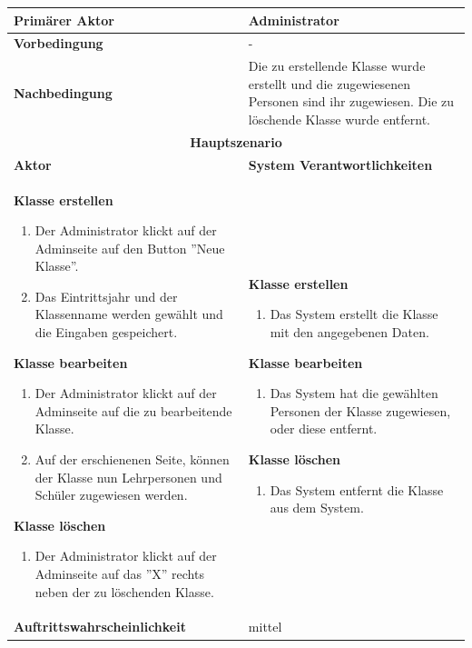 \begin{tabularx}{\textwidth}{| X | X |}
	\hline
		\textbf{Primärer Aktor} & Administrator \\
	\hline
		\textbf{Vorbedingung} & - \\
	\hline
		\textbf{Nachbedingung} & Die zu erstellende Klasse wurde erstellt und die zugewiesenen Personen sind ihr zugewiesen. Die zu löschende Klasse wurde entfernt. \\
	\hline
		\multicolumn{2}{|c|}{\textbf{Hauptszenario}} \\
	\hline
		\textbf{Aktor} & \textbf{System Verantwortlichkeiten} \\
	\hline
		\textbf{Klasse erstellen}
		\begin{enumerate}
			\item Der Administrator klickt auf der Adminseite auf den Button ''Neue Klasse''.
			\item Das Eintrittsjahr und der Klassenname werden gewählt und die Eingaben gespeichert.
		\end{enumerate}
		
		\textbf{Klasse bearbeiten}
		\begin{enumerate}
			\item Der Administrator klickt auf der Adminseite auf die zu bearbeitende Klasse.
			\item Auf der erschienenen Seite, können der Klasse nun Lehrpersonen und Schüler zugewiesen werden.
		\end{enumerate} 
		
		\textbf{Klasse löschen}
		\begin{enumerate}
			\item Der Administrator klickt auf der Adminseite auf das ''X'' rechts neben der zu löschenden Klasse.
		\end{enumerate} 
			& 
		\textbf{Klasse erstellen}
		\begin{enumerate}
			\item Das System erstellt die Klasse mit den angegebenen Daten.
		\end{enumerate} 
		
		\textbf{Klasse bearbeiten}
		\begin{enumerate}
			\item Das System hat die gewählten Personen der Klasse zugewiesen, oder diese entfernt.
		\end{enumerate}		
		
		\textbf{Klasse löschen}
		\begin{enumerate}
			\item Das System entfernt die Klasse aus dem System.
		\end{enumerate}	
		\\
	\hline
		\textbf{Auftrittswahrscheinlichkeit} & mittel \\
	\hline
\end{tabularx}


